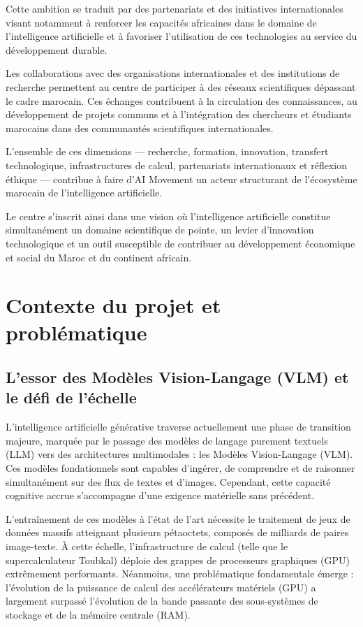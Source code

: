\documentclass[12pt,a4paper]{report}
\begin{document}
Cette ambition se traduit par des partenariats et des initiatives internationales visant notamment à renforcer les capacités africaines dans le domaine de l'intelligence artificielle et à favoriser l'utilisation de ces technologies au service du développement durable.

Les collaborations avec des organisations internationales et des institutions de recherche permettent au centre de participer à des réseaux scientifiques dépassant le cadre marocain. Ces échanges contribuent à la circulation des connaissances, au développement de projets communs et à l'intégration des chercheurs et étudiants marocains dans des communautés scientifiques internationales.

L'ensemble de ces dimensions --- recherche, formation, innovation, transfert technologique, infrastructures de calcul, partenariats internationaux et réflexion éthique --- contribue à faire d'AI Movement un acteur structurant de l'écosystème marocain de l'intelligence artificielle.

Le centre s'inscrit ainsi dans une vision où l'intelligence artificielle constitue simultanément un domaine scientifique de pointe, un levier d'innovation technologique et un outil susceptible de contribuer au développement économique et social du Maroc et du continent africain.

\newpage

\section{Contexte du projet et problématique}

\subsection{L'essor des Modèles Vision-Langage (VLM) et le défi de l'échelle}

L'intelligence artificielle générative traverse actuellement une phase de transition majeure, marquée par le passage des modèles de langage purement textuels (LLM) vers des architectures multimodales : les Modèles Vision-Langage (VLM). Ces modèles fondationnels sont capables d'ingérer, de comprendre et de raisonner simultanément sur des flux de textes et d'images. Cependant, cette capacité cognitive accrue s'accompagne d'une exigence matérielle sans précédent.

L'entraînement de ces modèles à l'état de l'art nécessite le traitement de jeux de données massifs atteignant plusieurs pétaoctets, composés de milliards de paires image-texte. À cette échelle, l'infrastructure de calcul (telle que le supercalculateur Toubkal) déploie des grappes de processeurs graphiques (GPU) extrêmement performants. Néanmoins, une problématique fondamentale émerge : l'évolution de la puissance de calcul des accélérateurs matériels (GPU) a largement surpassé l'évolution de la bande passante des sous-systèmes de stockage et de la mémoire centrale (RAM).
\end{document}
